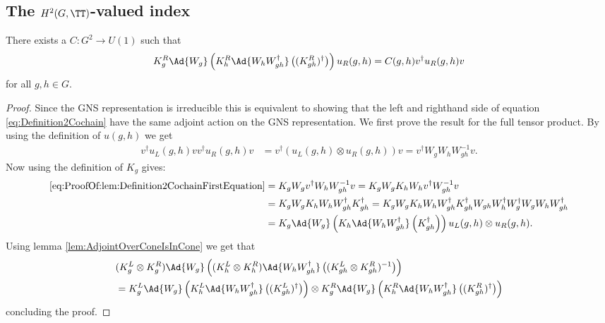 \subsection{The \texorpdfstring{$H^2(G,\TT)$}{H2}-valued index}\label{sec:DefinitionH2Index}
\begin{lemma}\label{lem:Definition2Cochain}
	There exists a $C:G^2\rightarrow U(1)$ such that 
	\begin{equation}\label{eq:Definition2Cochain}
		K_g^R\Ad{W_g}\left(K_h^R\Ad{W_hW_{gh}^\dagger}\left((K_{gh}^R)^\dagger\right)\right)u_
		R(g,h)=C(g,h)v^\dagger u_R(g,h)v
	\end{equation}
	for all $g,h\in G.$
\end{lemma}
\begin{proof}
	Since the GNS representation is irreducible this is equivalent to showing that the left and righthand side of equation \eqref{eq:Definition2Cochain} have the same adjoint action on the GNS representation. We first prove the result for the full tensor product. By using the definition of $u(g,h)$ we get
	\begin{align}\label{eq:ProofOf:lem:Definition2CochainFirstEquation}
		v^\dagger u_L(g,h)v v^\dagger u_R(g,h) v&=v^\dagger (u_L(g,h)\otimes u_R(g,h)) v =v^\dagger W_g W_h W_{gh}^{-1}v.
	\end{align}
	Now using the definition of $K_g$ gives:
	\begin{align}
		\eqref{eq:ProofOf:lem:Definition2CochainFirstEquation}&=K_gW_g v^\dagger W_h W_{gh}^{-1}v=K_gW_g K_h W_h v^\dagger W_{gh}^{-1}v\\
		\nonumber
		&=K_gW_g K_h W_h W_{gh}^\dagger K_{gh}^\dagger=K_gW_g K_h W_h W_{gh}^\dagger K_{gh}^\dagger W_{gh}W_h^\dagger W_g^\dagger W_gW_hW_{gh}^\dagger\\
		\nonumber
		&=K_g\Ad{W_g}\left(K_h\Ad{W_hW_{gh}^\dagger}\left(K_{gh}^\dagger\right)\right)u_L(g,h)\otimes u_
		R(g,h).
	\end{align}
	Using lemma \ref{lem:AdjointOverConeIsInCone} we get that
	\begin{align}
		&(K_g^L\otimes K_g^R)\Ad{W_g}\left((K_h^L\otimes K_h^R)\Ad{W_hW_{gh}^\dagger}\left((K_{gh}^L\otimes K_{gh}^R)^{-1}\right)\right)\\
		\nonumber
		&=K_g^L\Ad{W_g}\left(K_h^L\Ad{W_hW_{gh}^\dagger}\left((K_{gh}^L)^\dagger\right)\right)\otimes K_g^R\Ad{W_g}\left(K_h^R\Ad{W_hW_{gh}^\dagger}\left((K_{gh}^R)^\dagger\right)\right)
	\end{align}
	concluding the proof.
\end{proof}
